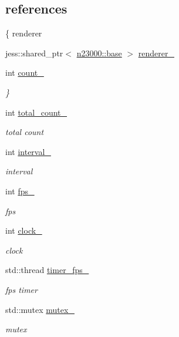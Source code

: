 \subsection*{references}
\label{_amgrp44a2dc91e1e21b653fd7ff6c63eca555}
 \{ renderer \begin{DoxyCompactItemize}
\item 
jess::shared\_\-ptr$<$ \hyperlink{classnebula_1_1platform_1_1renderer_1_1base}{n23000::base} $>$ \hyperlink{classnebula_1_1framework_1_1renderable_afbed356edc56ff22bfb194f7953d7db6}{renderer\_\-}
\item 
int \hyperlink{classnebula_1_1framework_1_1renderable_aa422953fdf36a303d11a46e423121c49}{count\_\-}
\begin{DoxyCompactList}\small\item\em \} \item\end{DoxyCompactList}\item 
int \hyperlink{classnebula_1_1framework_1_1renderable_a1362bec85c1587043dcf1b6a116193bb}{total\_\-count\_\-}
\begin{DoxyCompactList}\small\item\em total count \item\end{DoxyCompactList}\item 
int \hyperlink{classnebula_1_1framework_1_1renderable_af1f8fddc12fee8df07dfb1738ebf31f9}{interval\_\-}
\begin{DoxyCompactList}\small\item\em interval \item\end{DoxyCompactList}\item 
int \hyperlink{classnebula_1_1framework_1_1renderable_a5ce9a6025af9a419cd3bee66cb006d50}{fps\_\-}
\begin{DoxyCompactList}\small\item\em fps \item\end{DoxyCompactList}\item 
int \hyperlink{classnebula_1_1framework_1_1renderable_af923ef0d0bcae1f3a2af3c47bd3fc89b}{clock\_\-}
\begin{DoxyCompactList}\small\item\em clock \item\end{DoxyCompactList}\item 
std::thread \hyperlink{classnebula_1_1framework_1_1renderable_ad62bfb2a9f455443be5224818c8bf10d}{timer\_\-fps\_\-}
\begin{DoxyCompactList}\small\item\em fps timer \item\end{DoxyCompactList}\item 
std::mutex \hyperlink{classnebula_1_1framework_1_1renderable_ae996fad7ef87ef7f99501795192d9b13}{mutex\_\-}
\begin{DoxyCompactList}\small\item\em mutex \item\end{DoxyCompactList}\end{DoxyCompactItemize}



